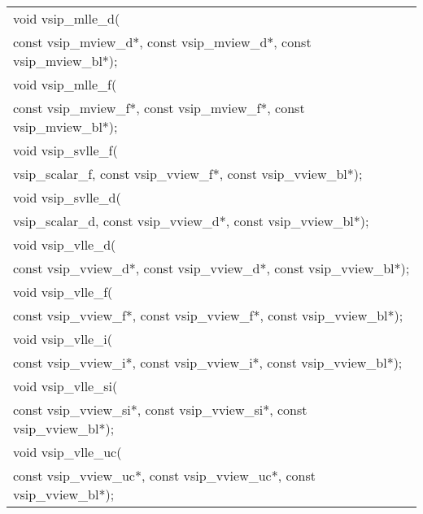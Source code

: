 \\\cvsiplh
\afh
{
\ttfamily
\\\hspace*{.04\textwidth}\begin{tabular}[H]{l}
void vsip\_mlle\_d(\\*\hspace{1cm}const vsip\_mview\_d*, const vsip\_mview\_d*, const vsip\_mview\_bl*);\\
void vsip\_mlle\_f(\\*\hspace{1cm}const vsip\_mview\_f*, const vsip\_mview\_f*, const vsip\_mview\_bl*);\\
void vsip\_svlle\_f(\\*\hspace{1cm}vsip\_scalar\_f, const vsip\_vview\_f*, const vsip\_vview\_bl*);\\
void vsip\_svlle\_d(\\*\hspace{1cm}vsip\_scalar\_d, const vsip\_vview\_d*, const vsip\_vview\_bl*);\\
void vsip\_vlle\_d(\\*\hspace{1cm}const vsip\_vview\_d*, const vsip\_vview\_d*, const vsip\_vview\_bl*);\\
void vsip\_vlle\_f(\\*\hspace{1cm}const vsip\_vview\_f*, const vsip\_vview\_f*, const vsip\_vview\_bl*);\\
void vsip\_vlle\_i(\\*\hspace{1cm}const vsip\_vview\_i*, const vsip\_vview\_i*, const vsip\_vview\_bl*);\\
void vsip\_vlle\_si(\\*\hspace{1cm}const vsip\_vview\_si*, const vsip\_vview\_si*, const vsip\_vview\_bl*);\\
void vsip\_vlle\_uc(\\*\hspace{1cm}const vsip\_vview\_uc*, const vsip\_vview\_uc*, const vsip\_vview\_bl*);\\
\end{tabular}
}
\\\pyjvsiph
{}
